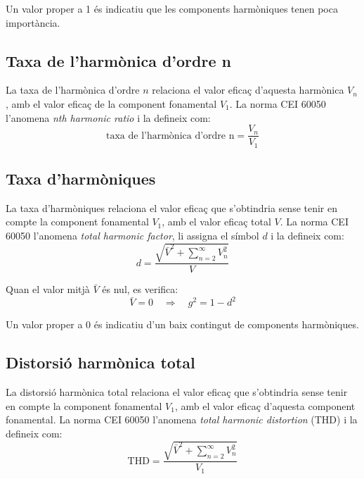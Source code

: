 Un valor proper a 1 és indicatiu que les components harmòniques tenen poca importància.

\subsection{Taxa de l'harmònica d'ordre n}

La taxa de l'harmònica d'ordre $n$  relaciona el valor eficaç d'aquesta harmònica  $V_n$, amb el valor eficaç de la component fonamental
 $V_1$. La norma CEI 60050 l'anomena \textit{nth harmonic ratio} i la defineix com:
\begin{equation}
    \text{taxa de l'harmònica d'ordre n} = \frac{V_n}{V_1}
\end{equation}


\subsection{Taxa d'harmòniques}
 

La taxa d'harmòniques relaciona el valor eficaç  que
s'obtindria sense tenir en compte  la component fonamental $V_1$, amb el valor
eficaç total $V$. La norma CEI 60050 l'anomena \textit{total harmonic factor}, li assigna el símbol $d$ i la defineix com:
\begin{equation}
    d = \frac{\sqrt{\bar{V}^2+\displaystyle\sum_{n=2}^\infty V^2_n}}{V}
\end{equation}

Quan el valor mitjà $\bar{V}$ és nul, es verifica:
\begin{equation}
    \bar{V}=0 \quad \Rightarrow\quad g^2 = 1 - d^2
\end{equation}

Un valor proper a 0 és indicatiu d'un baix contingut de components harmòniques.

\subsection{Distorsió harmònica total} 

 La distorsió harmònica total  relaciona el valor eficaç  que
s'obtindria sense tenir en compte  la component fonamental $V_1$,
amb el valor eficaç d'aquesta component fonamental. La norma CEI 60050 l'anomena \textit{total harmonic distortion} (THD) i la defineix com:
\begin{equation}
    \text{THD} = \frac{\sqrt{\bar{V}^2+  \displaystyle\sum_{n=2}^\infty V^2_n}} {V_1}
\end{equation}

